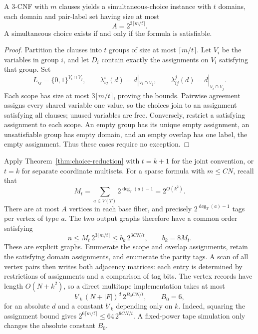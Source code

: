 \begin{lemma}
\label{lem:sat-choice}
A \(3\)-CNF with \(m\) clauses yields a simultaneous-choice instance with
\(t\) domains, each domain and pair-label set having size at most
\[
A=2^{3\lceil m/t\rceil}.
\]
A simultaneous choice exists if and only if the formula is satisfiable.
\end{lemma}
\begin{proof}
Partition the clauses into \(t\) groups of size at most \(\lceil m/t\rceil\).
Let \(V_i\) be the variables in group \(i\), and let \(D_i\) contain exactly
the assignments on \(V_i\) satisfying that group. Set
\[
L_{ij}=\{0,1\}^{V_i\cap V_j},
\qquad
\lambda_{ij}^i(d)=d|_{V_i\cap V_j},
\qquad
\lambda_{ij}^j(d)=d|_{V_i\cap V_j}.
\]
Each scope has size at most \(3\lceil m/t\rceil\), proving the bounds.
Pairwise agreement assigns every shared variable one value, so the
choices join to an assignment satisfying all clauses; unused variables
are free. Conversely, restrict a satisfying assignment to each scope.
An empty group has its unique empty assignment, an unsatisfiable group
has empty domain, and an empty overlap has one label, the empty
assignment. Thus these cases require no exception.
\end{proof}

Apply Theorem~\ref{thm:choice-reduction} with \(t=k+1\) for the
joint convention, or \(t=k\) for separate coordinate multisets.
For a sparse formula with \(m\le CN\), recall that
\[
M_t=\sum_{a\in V(T)}2^{\deg_T(a)-1}=2^{O(k^2)}.
\]
There are at most \(A\) vertices in each base fiber, and precisely
\(2^{\deg_T(a)-1}\) tags per vertex of type \(a\). The two output graphs
therefore have a common order satisfying
\begin{equation}
n\le M_t\,2^{3\lceil m/t\rceil}
   \le b_k\,2^{3CN/t},\qquad b_k=8M_t.
\label{eq:output-size}
\end{equation}
These are explicit graphs. Enumerate the scope and overlap assignments,
retain the satisfying domain assignments, and enumerate the parity
tags. A scan of all vertex pairs then writes both adjacency matrices:
each entry is determined by restrictions of assignments and a comparison
of tag bits. The vertex records have length \(O(N+k^2)\), so a direct
multitape implementation takes at most
\begin{equation}
b'_k\,(N+|F|)^{d}\,2^{B_0 CN/t},
\qquad B_0=6,
\label{eq:construction-time}
\end{equation}
for an absolute \(d\) and a constant \(b'_k\) depending only on \(k\).
Indeed, squaring the assignment bound gives
\(2^{6\lceil m/t\rceil}\le64\,2^{6CN/t}\).
A fixed-power tape simulation only changes the absolute constant \(B_0\).

